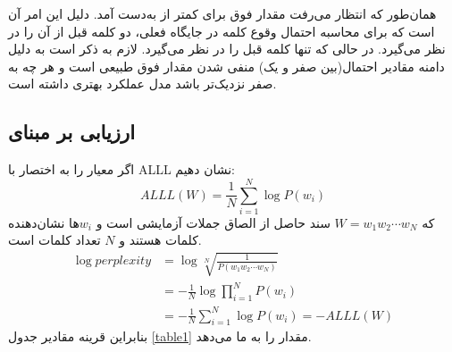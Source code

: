 \documentclass{article}
\begin{document}
	همان‌طور که انتظار می‌رفت مقدار فوق برای 
	کمتر از 
	به‌دست آمد. دلیل این امر آن است که  برای محاسبه احتمال وقوع کلمه در جایگاه فعلی، دو کلمه قبل از آن را در نظر می‌گیرد. در حالی که  تنها کلمه قبل را در نظر می‌گیرد. لازم به ذکر است به دلیل دامنه مقادیر احتمال(بین صفر و یک) منفی شدن مقدار فوق طبیعی است و هر چه به صفر نزدیک‌تر باشد مدل عملکرد بهتری داشته است.
	\subsection{ارزیابی بر مبنای }
	اگر معیار 
	را  به اختصار با ALLL نشان دهیم:
	\[
	ALLL(W) = \frac{1}{N}\sum_{i=1}^{N} \log P(w_i)
	\]
	که $ W=w_1w_2\cdots w_N $ سند حاصل از الصاق
	جملات آزمایشی است و 
	$w_i$ها
	نشان‌دهنده کلمات هستند و $ N $ تعداد کلمات است. 
	\begin{align*}
		\log perplexity &= \log \sqrt[N]{\frac{1}{P(w_1w_2\cdots w_N)}} \\
		&= -\frac1N \log \prod_{i=1}^{N} P(w_i) \\
		&= -\frac1N \sum_{i=1}^{N} \log P(w_i) = -ALLL(W)
	\end{align*}
	بنابراین قرینه مقادیر جدول 
	\ref{table1}
مقدار 
	را به ما می‌دهد.
	
	 
	 
\end{document}
